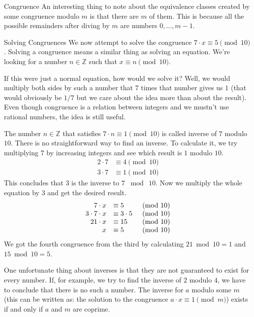 \documentclass[final]{beamer}
\newlength{\colwidth}
\newcommand{\Z}{\mathbb{Z}}
\begin{document}
\begin{frame}[t]
\begin{columns}[t]
\begin{column}{\colwidth}
\begin{block}{Congruence}
 An interesting thing to note about the equivalence classes created by some
 congruence modulo $m$ is that there are $m$ of them. This is because all the
 possible remainders after diving by $m$ are numbers $0, \ldots, m - 1$. 
\end{block}

\begin{exampleblock}{Solving Congruences}
 We now attempt to \alert{solve the congruence} $7 \cdot x \equiv 5 \pmod{10}$.
 \alert{Solving a congruence} means a similar thing as \alert{solving an
 equation}. We're looking for a number $n \in \Z$ such that $x \equiv n
 \pmod{10}$.

 If this were just a normal equation, how would we solve it? Well, we would
 multiply both sides by such a number that $7$ times that number gives us $1$
 (that would obviously be $1 / 7$ but we care about the idea more than about the
 result). Even though \alert{congruence is a relation between integers} and
 \alert{we mustn't use rational numbers}, the idea is still useful.

The number $n \in \Z$ that satisfies $7 \cdot n \equiv 1 \pmod{10}$ is called
\alert{inverse} of $7$ modulo $10$. There is no straightforward way to find
\alert{an inverse}. To calculate it, we try multiplying $7$ by increasing
integers and see which result is $1$ modulo $10$. 
\begin{equation*}
   \begin{split}
    2 \cdot 7 & \equiv 4 \pmod{10}\\
    3 \cdot 7 & \equiv 1 \pmod{10}
   \end{split}
  \end{equation*}
This concludes that $3$ is the \alert{inverse} to $7$ $\bmod~10$. Now \alert{we
multiply the whole equation by $3$} and get the desired result.
\[
 \begin{array}{r l r}
  7 \cdot x &\equiv 5 & \pmod{10}\\
  3 \cdot 7 \cdot x & \equiv 3 \cdot 5 & \pmod{10}\\
  21 \cdot x & \equiv 15 &\pmod{10}\\
  x & \equiv 5 &\pmod{10}
 \end{array}
\]
We got the fourth congruence from the third by calculating $21 \bmod 10 = 1$ and
$15 \bmod 10 = 5$.

One unfortunate thing about inverses is that they are not guaranteed to exist
for every number. If, for example, we try to find the inverse of $2$ modulo $4$,
we have to conclude that there is no such a number. The \alert{inverse} for $a$
modulo some $m$ (this can be written as: the solution to the congruence $a \cdot
x \equiv 1 \pmod{m}$) \alert{exists if and only if} $a$ and $m$ \alert{are
coprime}.


\end{exampleblock}
\end{column}
\end{columns}
\end{frame}
\end{document}
